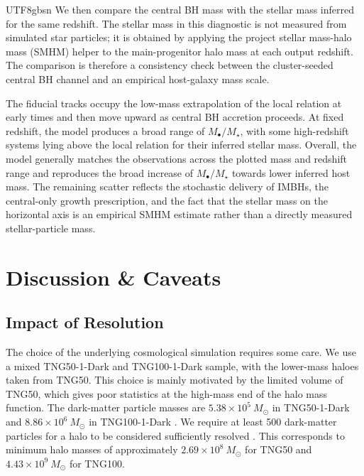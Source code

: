 \documentclass[trackchanges, twocolappendix, twocolumn]{aastex701}
\begin{document}
\begin{CJK*}{UTF8}{gbsn}
We then compare the central BH mass with the stellar mass inferred for the same redshift. The stellar mass in this diagnostic is not measured from simulated star particles; it is obtained by applying the project stellar mass-halo mass (SMHM) helper to the main-progenitor halo mass at each output redshift. The comparison is therefore a consistency check between the cluster-seeded central BH channel and an empirical host-galaxy mass scale.

The fiducial tracks occupy the low-mass extrapolation of the local \citet{ReinesVolonteri2015} relation at early times and then move upward as central BH accretion proceeds. At fixed redshift, the model produces a broad range of $M_\bullet/M_\star$, with some high-redshift systems lying above the local relation for their inferred stellar mass. Overall, the model generally matches the observations across the plotted mass and redshift range and reproduces the broad increase of $M_\bullet/M_\star$ towards lower inferred host mass. The remaining scatter reflects the stochastic delivery of IMBHs, the central-only growth prescription, and the fact that the stellar mass on the horizontal axis is an empirical SMHM estimate rather than a directly measured stellar-particle mass.

\section{Discussion \& Caveats} \label{sect:discuss}

\subsection{Impact of Resolution} \label{subsect:resolution}

The choice of the underlying cosmological simulation requires some care. We use a mixed TNG50-1-Dark and TNG100-1-Dark sample, with the lower-mass haloes taken from TNG50. This choice is mainly motivated by the limited volume of TNG50, which gives poor statistics at the high-mass end of the halo mass function. The dark-matter particle masses are \(5.38\times10^5~M_\odot\) in TNG50-1-Dark and \(8.86\times10^6~M_\odot\) in TNG100-1-Dark \citep{Springel+2018TNG}. We require at least 500 dark-matter particles for a halo to be considered sufficiently resolved \citep{Naoz+2009DM,Trenti+2010DM,Chen&Gnedin2023GC}. This corresponds to minimum halo masses of approximately \(2.69\times10^8~M_\odot\) for TNG50 and \(4.43\times10^9~M_\odot\) for TNG100.


\end{CJK*}
\end{document}
